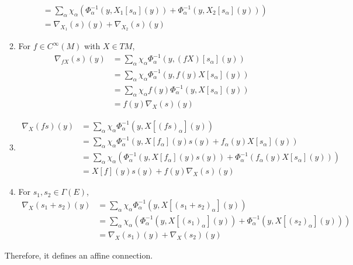 \documentclass[a4paper, 12pt]{article}
\theoremstyle{Mydefinition}
\theoremstyle{Mytheorem}
\begin{document}
\begin{enumerate}
\begin{enumerate}
\begin{equation*}
\begin{split}
                &=\sum_{\alpha}\chi_\alpha \left(\Phi_{\alpha}^{-1}(y, X_1[s_\alpha](y))+\Phi_{\alpha}^{-1}(y, X_2[s_\alpha](y))\right) \\
                &=\nabla_{X_1}(s)(y)+\nabla_{X_2}(s)(y)
            \end{split}
        \end{equation*}
        \item For $f\in C^\infty(M)$ with $X\in TM$,
        \begin{equation*}
            \begin{split}
                \nabla_{fX}(s)(y) &= \sum_{\alpha}\chi_\alpha \Phi_{\alpha}^{-1}(y, (fX)[s_\alpha](y))\\
                &= \sum_{\alpha}\chi_\alpha \Phi_{\alpha}^{-1}(y, f(y)X[s_\alpha](y))\\
                &= \sum_{\alpha}\chi_\alpha f(y)\Phi_{\alpha}^{-1}(y, X[s_\alpha](y))\\
                &= f(y)\nabla_X(s)(y)
            \end{split}
        \end{equation*}
        \item 
        \begin{equation*}
            \begin{split}
                \nabla_{X}(fs)(y) &= \sum_{\alpha}\chi_\alpha \Phi_{\alpha}^{-1}(y, X[(fs)_\alpha](y))\\
                &= \sum_{\alpha}\chi_\alpha \Phi_{\alpha}^{-1}(y, X[f_\alpha](y)s(y) + f_\alpha(y)X[s_\alpha](y))\\
                &= \sum_{\alpha}\chi_\alpha\left( \Phi_{\alpha}^{-1}(y, X[f_\alpha](y)s(y)) + \Phi_\alpha^{-1}(f_\alpha(y)X[s_\alpha](y))\right)\\
                &=X[f](y)s(y) + f(y)\nabla_X (s)(y)
            \end{split}
        \end{equation*}
        \item For $s_1, s_2\in \Gamma(E)$,
        \begin{equation*}
            \begin{split}
                \nabla_{X}(s_1+s_2)(y) &= \sum_{\alpha}\chi_\alpha \Phi_{\alpha}^{-1}(y, X[(s_1+s_2)_\alpha](y))\\
                &= \sum_{\alpha}\chi_\alpha\left( \Phi_{\alpha}^{-1}(y, X[(s_1)_\alpha](y))+\Phi_{\alpha}^{-1}(y, X[(s_2)_\alpha](y))\right)\\
                &=\nabla_X(s_1)(y)+\nabla_X(s_2)(y)
            \end{split}
        \end{equation*}
    \end{enumerate}
    Therefore, it defines an affine connection.
\end{enumerate}
\end{document}
